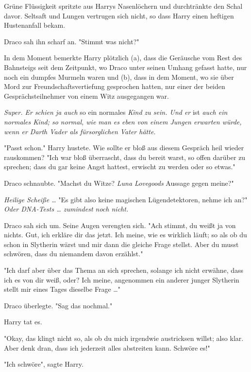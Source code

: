 {Grüne Flüssigkeit spritzte aus Harrys Nasenlöchern und durchtränkte den Schal davor. Seltsaft und Lungen vertrugen sich nicht, so dass Harry einen heftigen Hustenanfall bekam.

Draco sah ihn scharf an. "Stimmt was nicht?"

In dem Moment bemerkte Harry plötzlich (a), dass die Geräusche vom Rest des Bahnsteigs seit dem Zeitpunkt, wo Draco unter seinen Umhang gefasst hatte, nur noch ein dumpfes Murmeln waren und (b), dass in dem Moment, wo sie über Mord zur Freundschaftsvertiefung gesprochen hatten, nur einer der beiden Gesprächsteilnehmer von einem Witz ausgegangen war.

\emph{Super. Er schien ja auch} so ein normales \emph{Kind zu sein. Und er} ist \emph{auch ein normales Kind; so normal, wie man es eben von einem Jungen erwarten würde, wenn er Darth Vader als fürsorglichen Vater hätte.}

"Passt schon." Harry hustete. Wie sollte er bloß aus diesem Gespräch heil wieder rauskommen? "Ich war bloß überrascht, dass du bereit warst, so offen darüber zu sprechen; dass du gar keine Angst hattest, erwischt zu werden oder so etwas."

Draco schnaubte. "Machst du Witze? \emph{Luna Lovegoods} Aussage gegen meine?"

\emph{Heilige Scheiße …} "Es gibt also keine magischen Lügendetektoren, nehme ich an?" \emph{Oder DNA-Tests … zumindest noch nicht.}

Draco sah sich um. Seine Augen verengten sich. "Ach stimmt, du weißt ja von nichts. Gut, ich erkläre dir das jetzt. Ich meine, wie es wirklich läuft; so als ob du schon in Slytherin wärst und mir dann die gleiche Frage stellst. Aber du musst schwören, dass du niemandem davon erzählst."

"Ich darf aber über das Thema an sich sprechen, solange ich nicht erwähne, dass ich es von dir weiß, oder? Ich meine, angenommen ein anderer junger Slytherin stellt mir eines Tages dieselbe Frage …"

Draco überlegte. "Sag das nochmal."

Harry tat es.

"Okay, das klingt nicht so, als ob du mich irgendwie austricksen willst; also klar. Aber denk dran, dass ich jederzeit alles abstreiten kann. Schwöre es!"

"Ich schwöre", sagte Harry.

}

